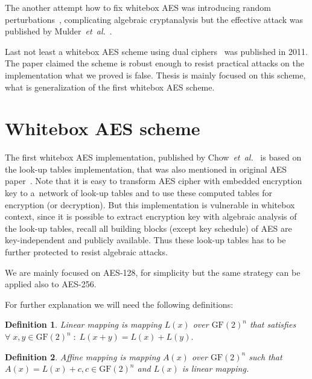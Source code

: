 \documentclass[11pt,oneside,final]{fithesis2}
\newtheorem{mydef}{Definition}
\newcommand{\eal}{\emph{et~al.}}
\begin{document}
    The another attempt how to fix whitebox AES was introducing random perturbations~\citep{journals/iacr/BringerCD06a}, 
    complicating algebraic cryptanalysis but the effective attack was published by Mulder~\eal~\citep{conf/indocrypt/MulderWP10}.
    
    Last not least a whitebox AES scheme using dual ciphers~\citep{Karroumi:2010:PWA:2041036.2041060} was published in 2011. The paper claimed 
    the scheme is robust enough to resist practical attacks on the implementation what we proved is false. 
    Thesis is mainly focused on this scheme, what is generalization of the first whitebox AES scheme. 
    

    \section{Whitebox AES scheme}

    The first whitebox AES implementation, published by Chow~\eal~\citep{Chow02white-boxcryptography} is based on the look-up tables implementation, that was also
    mentioned in original AES paper~\citep{2002-daemen}. Note that it is easy to transform AES cipher with embedded encryption key 
    to a~network of look-up tables and to use these computed tables for encryption (or decryption). But this implementation is vulnerable in whitebox context,
    since it is possible to extract encryption key with algebraic analysis of the look-up tables, recall all building blocks (except key schedule) of AES are key-independent 
    and publicly available. Thus these look-up tables has to be further protected to resist algebraic attacks. 
    
    We are mainly focused on AES-128, for simplicity but the same strategy can be applied also to AES-256.

    For further explanation we will need the following definitions:

    \begin{mydef}\label{def:linear_mapping}
    Linear mapping is mapping $L\left(x\right)$ over $\text{GF}(2)^n$ that satisfies $\forall \; x,y \in \text{GF}(2)^n \; : \; L(x+y) = L(x) + L(y).$
    \end{mydef}
    
    \begin{mydef}\label{def:affine_mapping}
    Affine mapping is mapping $A(x)$ over $\text{GF}(2)^n$ such that $A(x) = L(x) + c, c \in \text{GF}(2)^n$ and $L(x)$ is linear mapping.
    \end{mydef}
\end{document}
